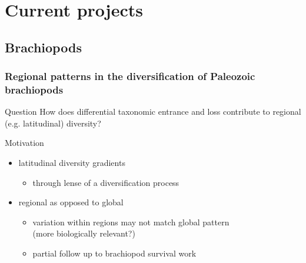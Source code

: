 \documentclass{beamer}
\begin{document}
\section{Current projects}
\subsection{Brachiopods}
\begin{frame}
  \frametitle{Regional patterns in the diversification of Paleozoic brachiopods}
  \begin{alertblock}{Question}
    How does differential taxonomic entrance and loss contribute to regional (e.g. latitudinal) diversity?
  \end{alertblock}
\end{frame}

\begin{frame}
  \begin{block}{Motivation}
    \begin{itemize}
      \item latitudinal diversity gradients
        \begin{itemize}
          \item through lense of a diversification process
        \end{itemize}
      \item regional as opposed to global
        \begin{itemize}
          \item variation within regions may not match global pattern \\(more biologically relevant?)
          \item partial follow up to brachiopod survival work
        \end{itemize}
    \end{itemize}
  \end{block}
\end{frame}
\end{document}
